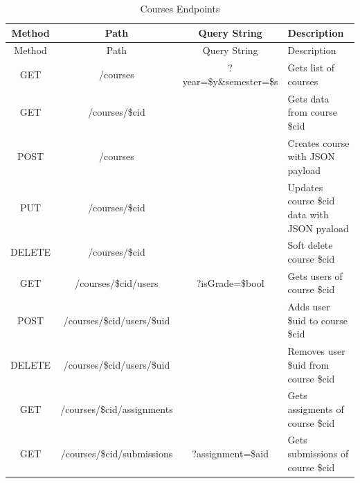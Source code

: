 \setlength{\extrarowheight}{1.5pt}
    \begin{longtable}{|c|c|c|m{4.5cm}|}
 \caption{Courses Endpoints\label{tab:addlabel}} \\
     \hline
    
    \centering  Method & Path & Query String & Description \\
    \hline \hline \endfirsthead
    
         \hline

    \centering  Method & Path & Query String & Description \\
    \hline \hline \endhead
    
    \endfoot 
    GET   & /courses & ?year=\$y\&semester=\$s & {Gets list of courses} \\ \hline
    GET   & /courses/\$cid &       & {Gets data from course \$cid} \\ \hline
    POST  & /courses &       & {Creates course with JSON payload} \\ \hline
    PUT   & /courses/\$cid &       & {Updates course \$cid data with JSON pyaload} \\ \hline
    DELETE & /courses/\$cid &       & {Soft delete course \$cid} \\ \hline
    GET   & /courses/\$cid/users & ?isGrade=\$bool & {Gets users of course \$cid} \\ \hline
    POST  & /courses/\$cid/users/\$uid &       & {Adds user \$uid to course \$cid} \\ \hline
    DELETE & /courses/\$cid/users/\$uid &       & {Removes user \$uid from course \$cid} \\ \hline
    GET   & /courses/\$cid/assignments &       & {Gets assigments of course \$cid} \\ \hline
    GET   & /courses/\$cid/submissions & ?assignment=\$aid & {Gets submissions of course \$cid} \\ \hline
\end{longtable}

